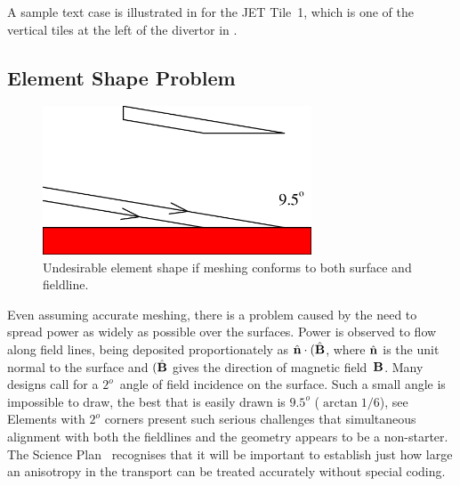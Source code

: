 A sample text case is illustrated in  for the JET Tile~1,
which is one of the vertical tiles at the left of the divertor in .

\clearpage
\subsection{Element Shape Problem} \label{sec:eltprob}
\begin{figure}
\centerline{\includegraphics[width=8cm]{../png/9p5deg}}
\caption{Undesirable element shape if meshing conforms to both surface and fieldline.\label{fig:9p5deg}}
\end{figure}

Even assuming accurate meshing, there is a problem caused by the need to spread power
as widely as possible over the surfaces. Power is observed to flow along field lines, being
deposited proportionately as $\hat{\bf n}\cdot(\hat{\bf B}$, where  $\hat{\bf n}$ is
the unit normal to the surface and $(\hat{\bf B}$ gives
the direction of magnetic field~${\bf B}$.
Many designs call for a $2^o$~angle of field incidence on the surface. Such a small angle
is impossible to draw, the best that
is easily drawn is $9.5^o$ ($\arctan 1/6$), see  Elements with $2^o$ corners present such serious
challenges that simultaneous alignment with both the fieldlines and the geometry appears
to be a non-starter. The Science Plan~\cite{sciplan} recognises that it will be important to establish just
how large an anisotropy in the transport can be treated accurately without special coding.


